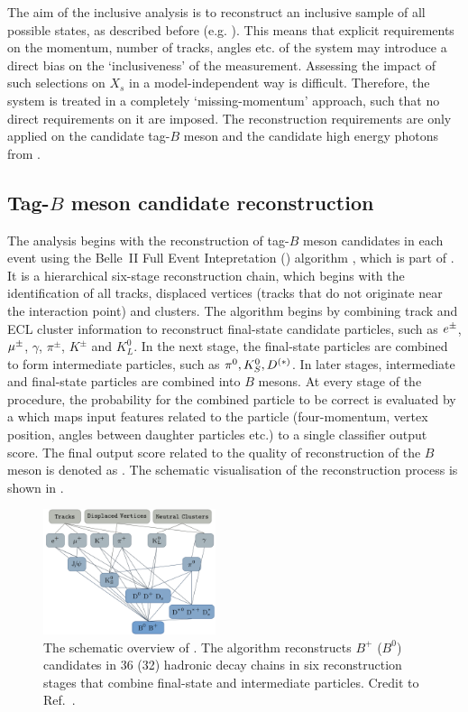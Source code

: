
The aim of the inclusive \BtoXsgamma analysis is to reconstruct an inclusive sample of all possible \Xs states, 
as described before (e.g. ).
This means that explicit requirements on the momentum, number of tracks, angles etc. of the \Xs system may introduce a direct bias on the `inclusiveness' of the measurement.
Assessing the impact of such selections on $X_s$ in a model-independent way is difficult.
Therefore, the \Xs system is treated in a completely `missing-momentum' approach, such that no direct requirements on it are imposed.
The reconstruction requirements are only applied on the candidate tag-$B$ meson and the candidate high energy photons from \BtoXsgamma.
\subsection{Tag-\texorpdfstring{$B$}{B} meson candidate reconstruction}\label{sec:tag_reconstruction}

The analysis begins with the reconstruction of tag-$B$ meson candidates in each event
using the Belle~II Full Event Intepretation (\FEI) algorithm \cite{Keck:2017mui,Keck:2018lcd}, which is part of \basftwo.
It is a hierarchical six-stage reconstruction chain, which begins with the identification of all tracks, displaced vertices (tracks that do not originate near the interaction point) and \ECL clusters.
The algorithm begins by combining track and ECL cluster information to reconstruct final-state candidate particles,
such as $e^\pm$, $\mu^{\pm}$, $\gamma$,  $\pi^{\pm}$, $K^{\pm}$ and $K_L^0$.
In the next stage, the final-state particles are combined to form intermediate particles, such as $\pi^0, K_S^0, D^{(*)}$.
In later stages, intermediate and final-state particles are combined into $B$ mesons.
At every stage of the procedure, the probability for the combined particle to be correct is evaluated by a \BDT
which maps input features related to the particle (four-momentum, vertex position, angles between daughter particles etc.) to a single classifier
output score. The final output score related to the quality of reconstruction of the $B$ meson is denoted as \feiProb. 
The schematic visualisation of the reconstruction process is shown in .
\begin{figure}[hbtp!]
    \centering
    \includegraphics[width=0.45\textwidth]{figures/event_reconstruction/FEI_tagging.png}
    \caption{\label{fig:fei_schematic} 
    The schematic overview of \FEI.
    The algorithm reconstructs $B^+$ ($B^0$) candidates in 36 (32) hadronic decay chains
    in six reconstruction stages that combine final-state and intermediate particles.
    Credit to Ref.~\cite{Keck:2018lcd}.
    }
\end{figure}

